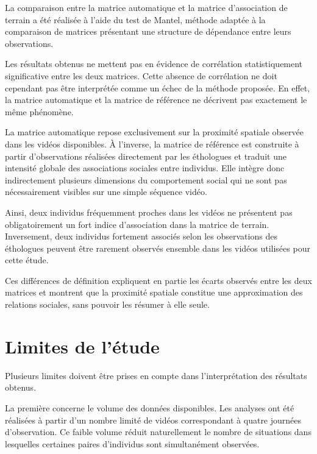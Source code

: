 \documentclass[11pt,a4paper]{report}
\begin{document}
La comparaison entre la matrice automatique et la matrice d'association
de terrain a été réalisée à l'aide du test de Mantel, méthode adaptée à
la comparaison de matrices présentant une structure de dépendance entre
leurs observations.

Les résultats obtenus ne mettent pas en évidence de corrélation
statistiquement significative entre les deux matrices. Cette absence de
corrélation ne doit cependant pas être interprétée comme un échec de la
méthode proposée. En effet, la matrice automatique et la matrice de
référence ne décrivent pas exactement le même phénomène.

La matrice automatique repose exclusivement sur la proximité spatiale
observée dans les vidéos disponibles. À l'inverse, la matrice de
référence est construite à partir d'observations réalisées directement
par les éthologues et traduit une intensité globale des associations
sociales entre individus. Elle intègre donc indirectement plusieurs
dimensions du comportement social qui ne sont pas nécessairement visibles
sur une simple séquence vidéo.

Ainsi, deux individus fréquemment proches dans les vidéos ne présentent
pas obligatoirement un fort indice d'association dans la matrice de
terrain. Inversement, deux individus fortement associés selon les
observations des éthologues peuvent être rarement observés ensemble dans
les vidéos utilisées pour cette étude.

Ces différences de définition expliquent en partie les écarts observés
entre les deux matrices et montrent que la proximité spatiale constitue
une approximation des relations sociales, sans pouvoir les résumer à
elle seule.

\section{Limites de l'étude}

Plusieurs limites doivent être prises en compte dans l'interprétation des
résultats obtenus.

La première concerne le volume des données disponibles. Les analyses ont
été réalisées à partir d'un nombre limité de vidéos correspondant à
quatre journées d'observation. Ce faible volume réduit naturellement le
nombre de situations dans lesquelles certaines paires d'individus sont
simultanément observées.
\end{document}
